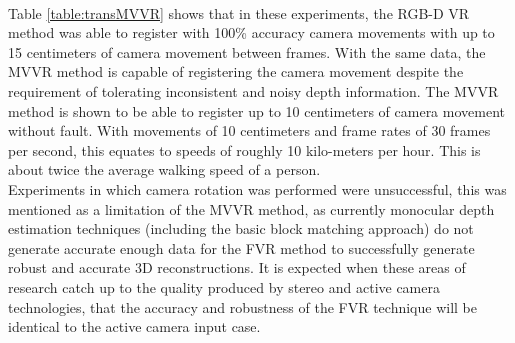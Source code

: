 \begin{table}[!htb]
\centering
{}
\\
\caption{Translation Tracking Error for FVR and MVVR}
\label{table:transMVVR}
\end{table}


Table \ref{table:transMVVR} shows that in these experiments, the RGB-D VR method was able to register with 100\% accuracy camera movements with up to 15 centimeters of camera movement between frames. With the same data, the MVVR method is capable of registering the camera movement despite the requirement of tolerating inconsistent and noisy depth information. The MVVR method is shown to be able to register up to 10 centimeters of camera movement without fault. With movements of 10 centimeters and frame rates of 30 frames per second, this equates to speeds of roughly 10 kilo-meters per hour. This is about twice the average walking speed of a person. \\

Experiments in which camera rotation was performed were unsuccessful, this was mentioned as a limitation of the MVVR method, as currently monocular depth estimation techniques (including the basic block matching approach) do not generate accurate enough data for the FVR method to successfully generate robust and accurate 3D reconstructions. It is expected when these areas of research catch up to the quality produced by stereo and active camera technologies, that the accuracy and robustness of the FVR technique will be identical to the active camera input case. \\
